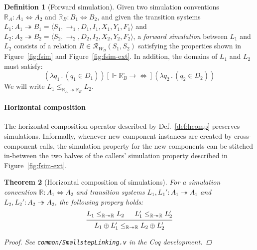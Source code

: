 \documentclass[11pt,oneside,draft]{book}
\newtheorem{theorem}{Theorem}[chapter]
\theoremstyle{definition}
\newtheorem{definition}[theorem]{Definition}
\newcommand{\ifr}[1]{\mathrel{[{#1}]}}
\newcommand{\que}{\circ}         %
\begin{document}
\begin{definition}[Forward simulation] \label{def:fsim} %
Given
two simulation conventions
$\mathbb{R}_A : A_1 \Leftrightarrow A_2$ and
$\mathbb{R}_B : B_1 \Leftrightarrow B_2$,
and given
the transition systems
$L_1 : A_1 \twoheadrightarrow B_1 = \langle S_1, {\rightarrow}_1, D_1, I_1, X_1, Y_1, F_1 \rangle$ and
$L_2 : A_2 \twoheadrightarrow B_2 = \langle S_2, {\rightarrow}_2, D_2, I_2, X_2, Y_2, F_2 \rangle$,
a \emph{forward simulation} between $L_1$ and $L_2$
consists of a relation
$R \in \mathcal{R}_{W_B}(S_1, S_2)$
satisfying the properties shown in
Figure~\ref{fig:fsim} and Figure~\ref{fig:fsim-ext}.
In addition, the domains of $L_1$ and $L_2$
must satisfy:
\[
  (\lambda q_1 \, . \, (q_1 \in D_1))
  \ifr{\Vdash \mathbb{R}_B^\que \rightarrow {\Leftrightarrow}}
  (\lambda q_2 \, . \, (q_2 \in D_2))
\]
We will write $L_1 \le_{\mathbb{R}_A \twoheadrightarrow \mathbb{R}_B} L_2$.
\end{definition}


\paragraph{Horizontal composition} %

The horizontal composition operator
described by Def.~\ref{def:hcomp}
preserves simulations.
Informally,
whenever new component instances are created
by cross-component calls,
the simulation property for the new components
can be stitched in-between
the two halves of the callers' simulation property
described in Figure~\ref{fig:fsim-ext}.

\begin{theorem}[Horizontal composition of simulations] \label{thm:fsim-hcomp} %
For a simulation convention
$\mathbb{R} : A_1 \Leftrightarrow A_2$
and transition systems
$L_1, L_1' : A_1 \twoheadrightarrow A_1$ and
$L_2, L_2' : A_2 \twoheadrightarrow A_2$,
the following propery holds:
\[
  \begin{prooftree}
    \hypo{L_1 \le_{\mathbb{R} \twoheadrightarrow \mathbb{R}} L_2}
    \hypo{L_1' \le_{\mathbb{R} \twoheadrightarrow \mathbb{R}} L_2'}
    \infer2{L_1 \oplus L_1'
      \le_{\mathbb{R} \twoheadrightarrow \mathbb{R}}
      L_2 \oplus L_2'}
  \end{prooftree}
\]
\begin{proof}
See \texttt{common/SmallstepLinking.v}
in the Coq development.
\end{proof}
\end{theorem}
\end{document}

